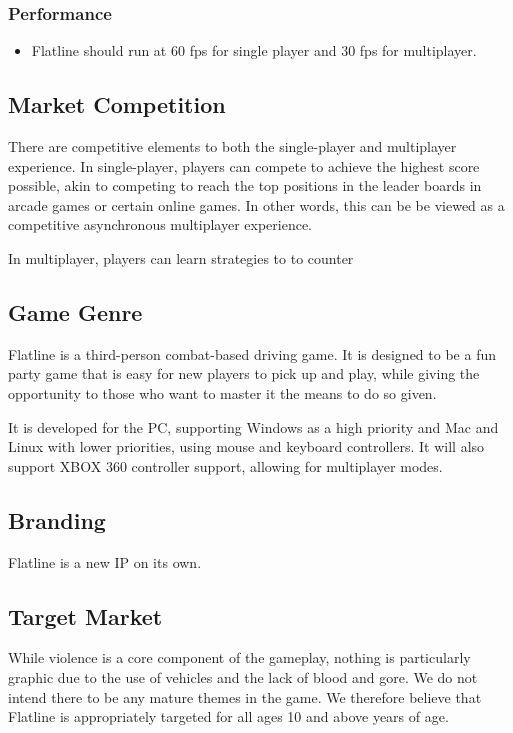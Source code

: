 \documentclass{article}
\newcommand{\name}{Flatline}
\theoremstyle{definition}
\begin{document}
\subsubsection{Performance}

\begin{itemize}
  \item \name{} should run at 60 fps for single player and 30 fps for
    multiplayer.
\end{itemize}


\subsection{Market Competition}

There are competitive elements to both the single-player and multiplayer
experience. In single-player, players can compete to achieve the highest score
possible, akin to competing to reach the top positions in the leader boards
in arcade games or certain online games. In other words, this can be be viewed
as a competitive asynchronous multiplayer experience.

In multiplayer, players can learn strategies to to counter 

\subsection{Game Genre} %

\name{} is a third-person combat-based driving game. It is designed to be
a fun party game that is easy for new players to pick up and play, while giving
the opportunity to those who want to master it the means to do so given.

It is developed for the PC, supporting Windows as a high priority and Mac and
Linux with lower priorities, using mouse and keyboard controllers. It will also
support XBOX 360 controller support, allowing for multiplayer modes.

\subsection{Branding}

\name{} is a new IP on its own.

\subsection{Target Market}

While violence is a core component of the gameplay, nothing is particularly
graphic due to the use of vehicles and the lack of blood and gore. We do not
intend there to be any mature themes in the game. We therefore believe that
\name{} is appropriately targeted for all ages 10 and above years of age.
\end{document}
